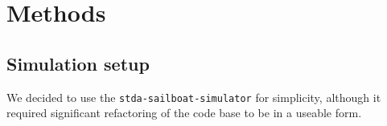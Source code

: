 \documentclass[conference]{IEEEtran}
\newcommand{\Sim}{\lstinline{stda-sailboat-simulator}\ }
\begin{document}









\section{Methods}
\subsection{Simulation setup}
We decided to use the \lstinline{stda-sailboat-simulator} for simplicity, although it required significant 
refactoring of the code base to be in a useable form.
\end{document}
